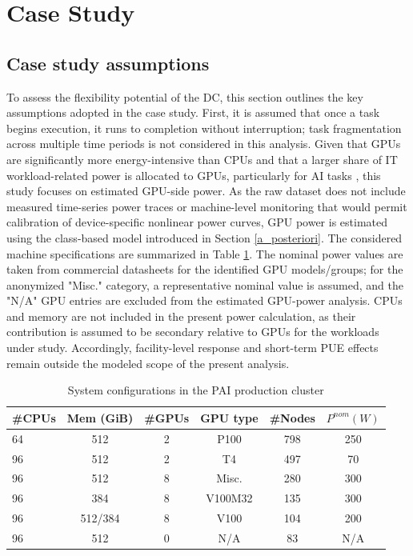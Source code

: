 \documentclass[preprint,12pt]{elsarticle}
\begin{document}
\section{Case Study}\label{case study}
\subsection{Case study assumptions}
To assess the flexibility potential of the DC, this section outlines the key assumptions adopted in the case study. First, it is assumed that once a task begins execution, it runs to completion without interruption; task fragmentation across multiple time periods is not considered in this analysis. Given that GPUs are significantly more energy-intensive than CPUs and that a larger share of IT workload-related power is allocated to GPUs, particularly for AI tasks \cite{LLM}, this study focuses on estimated GPU-side power. As the raw dataset does not include measured time-series power traces or machine-level monitoring that would permit calibration of device-specific nonlinear power curves, GPU power is estimated using the class-based model introduced in Section \ref{a_posteriori}.
The considered machine specifications are summarized in Table \ref{tab:specs}. The nominal power values are taken from commercial datasheets for the identified GPU models/groups; for the anonymized "Misc." category, a representative nominal value is assumed, and the "N/A" GPU entries are excluded from the estimated GPU-power analysis. CPUs and memory are not included in the present power calculation, as their contribution is assumed to be secondary relative to GPUs for the workloads under study. Accordingly, facility-level response and short-term PUE effects remain outside the modeled scope of the present analysis.

\begin{table}[h!]
\centering
\caption{System configurations in the PAI production cluster \cite{Weng2022}}
\label{tab:specs}
\begin{tabular}{lccccc}
\toprule
\textbf{\#CPUs} & \textbf{Mem (GiB)} & \textbf{\#GPUs} & \textbf{GPU type} & \textbf{\#Nodes} & \textbf{$P^{nom} (W)$} \\
\midrule
 64  & 512       & 2 & P100        & 798 &  250 \\
 96  & 512       & 2 & T4          & 497 & 70\\
 96  & 512       & 8 & Misc.       & 280 & 300\\
 96  & 384       & 8 & V100M32 & 135  & 300\\
 96  & 512/384   & 8 & V100    & 104 & 200\\
 96  & 512       & 0 & N/A         & 83 & N/A \\
\bottomrule
\end{tabular}
\end{table}
\end{document}
